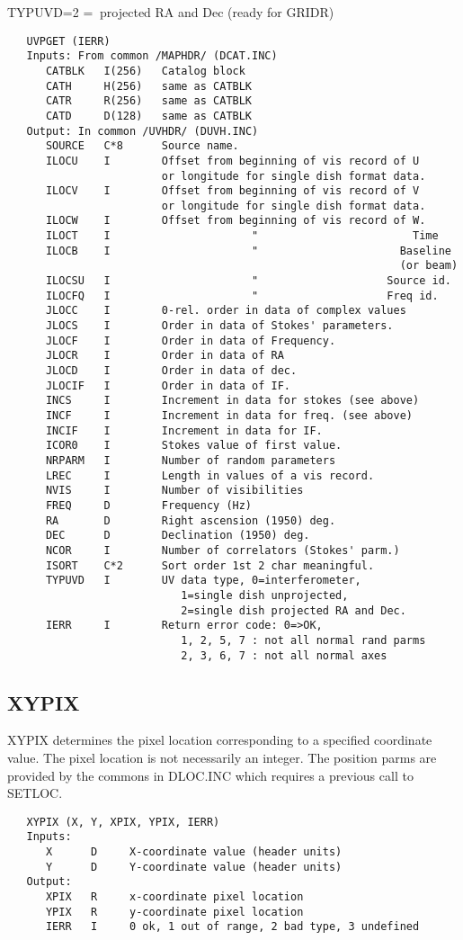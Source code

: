 TYPUVD=2 =$\>$ projected RA and Dec (ready for GRIDR)
\begin{verbatim}
   UVPGET (IERR)
   Inputs: From common /MAPHDR/ (DCAT.INC)
      CATBLK   I(256)   Catalog block
      CATH     H(256)   same as CATBLK
      CATR     R(256)   same as CATBLK
      CATD     D(128)   same as CATBLK
   Output: In common /UVHDR/ (DUVH.INC)
      SOURCE   C*8      Source name.
      ILOCU    I        Offset from beginning of vis record of U
                        or longitude for single dish format data.
      ILOCV    I        Offset from beginning of vis record of V
                        or longitude for single dish format data.
      ILOCW    I        Offset from beginning of vis record of W.
      ILOCT    I                      "                        Time
      ILOCB    I                      "                      Baseline
                                                             (or beam)
      ILOCSU   I                      "                    Source id.
      ILOCFQ   I                      "                    Freq id.
      JLOCC    I        0-rel. order in data of complex values
      JLOCS    I        Order in data of Stokes' parameters.
      JLOCF    I        Order in data of Frequency.
      JLOCR    I        Order in data of RA
      JLOCD    I        Order in data of dec.
      JLOCIF   I        Order in data of IF.
      INCS     I        Increment in data for stokes (see above)
      INCF     I        Increment in data for freq. (see above)
      INCIF    I        Increment in data for IF.
      ICOR0    I        Stokes value of first value.
      NRPARM   I        Number of random parameters
      LREC     I        Length in values of a vis record.
      NVIS     I        Number of visibilities
      FREQ     D        Frequency (Hz)
      RA       D        Right ascension (1950) deg.
      DEC      D        Declination (1950) deg.
      NCOR     I        Number of correlators (Stokes' parm.)
      ISORT    C*2      Sort order 1st 2 char meaningful.
      TYPUVD   I        UV data type, 0=interferometer,
                           1=single dish unprojected,
                           2=single dish projected RA and Dec.
      IERR     I        Return error code: 0=>OK,
                           1, 2, 5, 7 : not all normal rand parms
                           2, 3, 6, 7 : not all normal axes
\end{verbatim}

\subsection{XYPIX}
XYPIX determines the pixel location corresponding to a specified
coordinate value.  The pixel location is not necessarily an
integer.  The position parms are provided by the commons in DLOC.INC
 which requires a previous call to SETLOC.
\begin{verbatim}
   XYPIX (X, Y, XPIX, YPIX, IERR)
   Inputs:
      X      D     X-coordinate value (header units)
      Y      D     Y-coordinate value (header units)
   Output:
      XPIX   R     x-coordinate pixel location
      YPIX   R     y-coordinate pixel location
      IERR   I     0 ok, 1 out of range, 2 bad type, 3 undefined
\end{verbatim}

